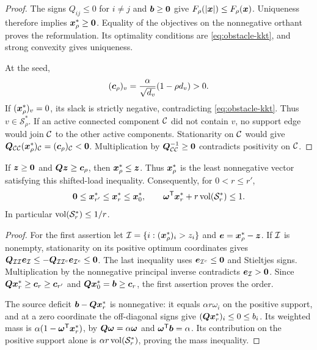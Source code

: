 \begin{proof}
The signs $Q_{ij}\leq0$ for $i\neq j$ and $\bm{b}\geq\bm{0}$ give
$F_\rho(|\bm{x}|)\leq F_\rho(\bm{x})$. Uniqueness therefore implies
$\bm{x}_\rho^*\geq\bm{0}$. Equality of the objectives on the nonnegative
orthant proves the reformulation. Its optimality conditions are
\cref{eq:obstacle-kkt}, and strong convexity gives uniqueness.

At the seed,
\[
 (\bm{c}_\rho)_v=\frac{\alpha}{\sqrt{d_v}}(1-\rho d_v)>0.
\]
If $(\bm{x}_\rho^*)_v=0$, its slack is strictly negative, contradicting
\cref{eq:obstacle-kkt}.  Thus $v\in\mathcal S_\rho^*$.  If an active connected
component $\mathcal{C}$ did not contain $v$, no support edge would join $\mathcal{C}$ to the
other active components.  Stationarity on $\mathcal{C}$ would give
$\bm{Q}_{\mathcal{C}\mathcal{C}}(\bm{x}_\rho^*)_{\mathcal{C}}=(\bm{c}_\rho)_{\mathcal{C}}<\bm{0}$.  Multiplication by
$\bm{Q}_{\mathcal{C}\mathcal{C}}^{-1}\geq\bm{0}$ contradicts positivity on $\mathcal{C}$.
\end{proof}

\begin{lemma}
\label{lem:rppr-order-mass}
If $\bm{z}\geq\bm{0}$ and $\bm{Q}\bm{z}\geq\bm{c}_\rho$, then
$\bm{x}_\rho^*\leq\bm{z}$. Thus $\bm{x}_\rho^*$ is the least nonnegative vector
satisfying this shifted-load inequality. Consequently, for $0<r\leq r'$,
\begin{equation}
 \bm{0}\leq\bm{x}_{r'}^*\leq\bm{x}_r^*\leq\bm{x}_0^*,
 \qquad \bm{\omega}^{\mathsf{T}}\bm{x}_r^*+r\operatorname{vol}(\mathcal S_r^*)\leq1.
 \label{eq:rppr-order-mass}
\end{equation}
In particular $\operatorname{vol}(\mathcal S_r^*)\leq1/r$.
\end{lemma}
\begin{proof}
For the first assertion let $\mathcal{I}=\{i:(\bm{x}_\rho^*)_i>z_i\}$ and
$\bm{e}=\bm{x}_\rho^*-\bm{z}$. If $\mathcal{I}$ is nonempty, stationarity on
its positive optimum coordinates gives
$\bm{Q}_{\mathcal{I}\mathcal{I}}\bm{e}_{\mathcal{I}}
 \leq-\bm{Q}_{\mathcal{I}\mathcal{I}^c}\bm{e}_{\mathcal{I}^c}\leq\bm{0}$.
The last inequality uses $\bm{e}_{\mathcal{I}^c}\leq\bm{0}$ and Stieltjes signs.
Multiplication by the nonnegative principal inverse contradicts
$\bm{e}_{\mathcal{I}}>\bm{0}$. Since
$\bm{Q}\bm{x}_r^*\geq\bm{c}_r\geq\bm{c}_{r'}$ and
$\bm{Q}\bm{x}_0^*=\bm{b}\geq\bm{c}_r$, the first assertion proves the order.

The source deficit $\bm{b}-\bm{Q}\bm{x}_r^*$ is nonnegative: it equals
$\alpha r\omega_i$ on the positive support, and at a zero coordinate
the off-diagonal signs give $(\bm{Q}\bm{x}_r^*)_i\leq0\leq b_i$.
Its weighted mass is
$\alpha(1-\bm{\omega}^{\mathsf{T}}\bm{x}_r^*)$, by
$\bm{Q}\bm{\omega}=\alpha\bm{\omega}$ and $\bm{\omega}^{\mathsf{T}}\bm{b}=\alpha$.
Its contribution on the positive support alone is
$\alpha r\operatorname{vol}(\mathcal S_r^*)$, proving the mass inequality.
\end{proof}

